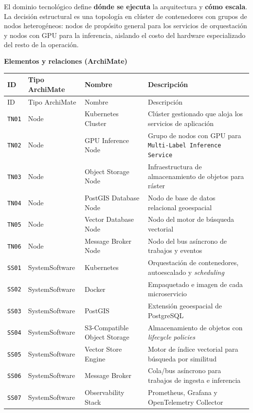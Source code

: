 \documentclass{article}
\newcommand{\mdhfour}[1]{\par\medskip\noindent\textbf{#1}\par\nobreak\smallskip}
\begin{document}
El dominio tecnológico define \textbf{dónde se ejecuta} la arquitectura y \textbf{cómo escala}. La decisión estructural es una topología en clúster de contenedores con grupos de nodos heterogéneos: nodos de propósito general para los servicios de orquestación y nodos con GPU para la inferencia, aislando el costo del hardware especializado del resto de la operación.

\mdhfour{Elementos y relaciones (ArchiMate)}

{\small
\begin{longtable}{@{}L{0.40in}L{1.27in}L{1.36in}L{2.90in}@{}}
\toprule
ID & Tipo ArchiMate & Nombre & Descripción \\
\midrule
\endfirsthead
\toprule
ID & Tipo ArchiMate & Nombre & Descripción \\
\midrule
\endhead
\bottomrule
\endlastfoot
\texttt{TN01} & Node & Kubernetes Cluster & Clúster gestionado que aloja los servicios de aplicación \\
\texttt{TN02} & Node & GPU Inference Node & Grupo de nodos con GPU para \texttt{Multi-\allowbreak{}Label Inference Service} \\
\texttt{TN03} & Node & Object Storage Node & Infraestructura de almacenamiento de objetos para ráster \\
\texttt{TN04} & Node & PostGIS Database Node & Nodo de base de datos relacional geoespacial \\
\texttt{TN05} & Node & Vector Database Node & Nodo del motor de búsqueda vectorial \\
\texttt{TN06} & Node & Message Broker Node & Nodo del bus asíncrono de trabajos y eventos \\
\texttt{SS01} & SystemSoftware & Kubernetes & Orquestación de contenedores, autoescalado y \emph{scheduling} \\
\texttt{SS02} & SystemSoftware & Docker & Empaquetado e imagen de cada microservicio \\
\texttt{SS03} & SystemSoftware & PostGIS & Extensión geoespacial de PostgreSQL \\
\texttt{SS04} & SystemSoftware & S3-Compatible Object Storage & Almacenamiento de objetos con \emph{lifecycle policies} \\
\texttt{SS05} & SystemSoftware & Vector Store Engine & Motor de índice vectorial para búsqueda por similitud \\
\texttt{SS06} & SystemSoftware & Message Broker & Cola/bus asíncrono para trabajos de ingesta e inferencia \\
\texttt{SS07} & SystemSoftware & Observability Stack & Prometheus, Grafana y OpenTelemetry Collector \\

\end{longtable}}
\end{document}
